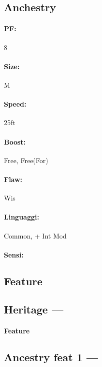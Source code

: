 \documentclass[
a4paper,
twoside,
11pt, 
openany,
]{memoir}
\begin{document}
\characterSheet

\clearpage
\restoregeometry

\begin{multicols*}{2}
	\maketitle
	
	\section*{Anchestry}
	\paragraph{PF:} 8
	\paragraph{Size:} M
	\paragraph{Speed:} 25ft
	\paragraph{Boost:} Free, Free(For)
	\paragraph{Flaw:} Wis
	\paragraph{Linguaggi:} Common, + Int Mod
	\paragraph{Sensi:}
	
	\subsection{Feature }

	
	\subsection{Heritage — }
	\paragraph{Feature} 
	
	\subsection{Ancestry feat 1 — }

\end{multicols*}
\end{document}
